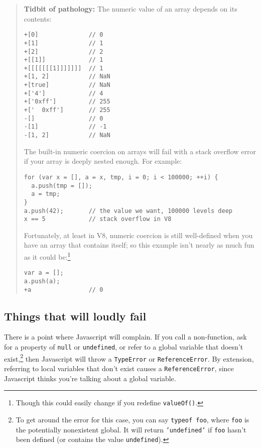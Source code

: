 \documentclass{article}
\begin{document}
    \begin{quote}
      {\bf Tidbit of pathology:} The numeric value of an array depends on its contents:

\begin{verbatim}
+[0]              // 0
+[1]              // 1
+[2]              // 2
+[[1]]            // 1
+[[[[[[[1]]]]]]]  // 1
+[1, 2]           // NaN
+[true]           // NaN
+['4']            // 4
+['0xff']         // 255
+['  0xff']       // 255
-[]               // 0
-[1]              // -1
-[1, 2]           // NaN
\end{verbatim}

      The built-in numeric coercion on arrays will fail with a stack overflow error if your array is deeply nested enough. For example:

\begin{verbatim}
for (var x = [], a = x, tmp, i = 0; i < 100000; ++i) {
  a.push(tmp = []);
  a = tmp;
}
a.push(42);       // the value we want, 100000 levels deep
x == 5            // stack overflow in V8
\end{verbatim}

      Fortunately, at least in V8, numeric coercion is still well-defined when you have an array that contains itself; so this example isn't nearly as much fun as it could be:\footnote{Though
      this could easily change if you redefine {\tt valueOf()}.}

\begin{verbatim}
var a = [];
a.push(a);
+a                // 0
\end{verbatim}
    \end{quote}

\subsection {Things that will loudly fail}
    There is a point where Javascript will complain. If you call a non-function, ask for a property of \verb|null| or \verb|undefined|, or refer to a global variable that doesn't
    exist,\footnote{To get around the error for this case, you can say {\tt typeof foo}, where {\tt foo} is the potentially nonexistent global. It will return {\tt 'undefined'} if
    {\tt foo} hasn't been defined (or contains the value {\tt undefined}).} then Javascript will throw a \verb|TypeError| or \verb|ReferenceError|. By extension, referring to local variables
    that don't exist causes a \verb|ReferenceError|, since Javascript thinks you're talking about a global variable.
\end{document}
